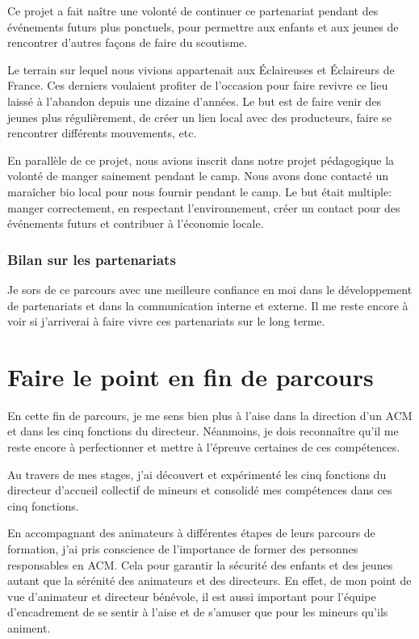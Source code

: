 \documentclass[titlepage,11pt,a4paper]{article}
\begin{document}
Ce projet a fait naître une volonté de continuer ce partenariat pendant des événements
futurs plus ponctuels, pour permettre aux enfants et aux jeunes de rencontrer d'autres
façons de faire du scoutisme.

Le terrain sur lequel nous vivions appartenait aux Éclaireuses et Éclaireurs de France. Ces
derniers voulaient profiter de l'occasion pour faire revivre ce lieu laissé à l'abandon
depuis une dizaine d'années. Le but est de faire venir des jeunes plus régulièrement, de
créer un lien local avec des producteurs, faire se rencontrer différents mouvements, etc.

En parallèle de ce projet, nous avions inscrit dans notre projet pédagogique la volonté de
manger sainement pendant le camp. Nous avons donc contacté un maraîcher bio local pour nous
fournir pendant le camp. Le but était multiple: manger correctement, en respectant
l'environnement, créer un contact pour des événements futurs et contribuer à l'économie
locale.

\subsubsection{Bilan sur les partenariats}

Je sors de ce parcours avec une meilleure confiance en moi dans le développement
de partenariats et dans la communication interne et externe. Il me reste encore à voir
si j'arriverai à faire vivre ces partenariats sur le long terme.

\clearpage
\section{Faire le point en fin de parcours}

En cette fin de parcours, je me sens bien plus à l'aise dans la direction d'un ACM et dans
les cinq fonctions du directeur. Néanmoins, je dois reconnaître qu'il me reste encore à
perfectionner et mettre à l'épreuve certaines de ces compétences.

Au travers de mes stages, j'ai découvert et expérimenté les cinq fonctions du directeur d'accueil
collectif de mineurs et consolidé mes compétences dans ces cinq fonctions.

En accompagnant des animateurs à différentes étapes de leurs parcours de formation, j'ai
pris conscience de l'importance de former des personnes
responsables en ACM\@. Cela pour garantir la sécurité des enfants et des jeunes autant que
la sérénité des animateurs et des directeurs. En effet, de mon point de vue d'animateur et
directeur bénévole, il est aussi important pour l'équipe d'encadrement de se sentir à
l'aise et de s'amuser que pour les mineurs qu'ils animent.
\end{document}
